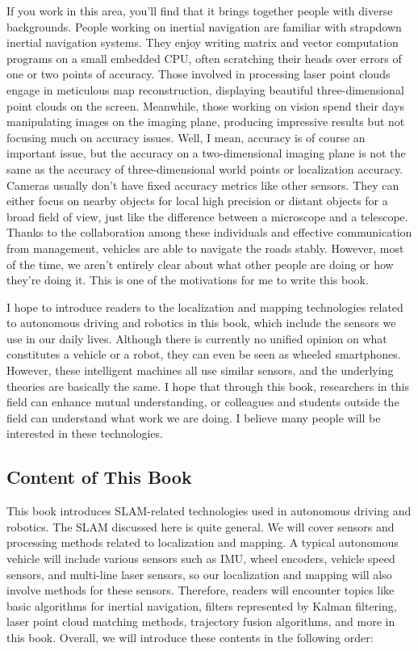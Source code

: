 If you work in this area, you'll find that it brings together people with diverse backgrounds. People working on inertial navigation are familiar with strapdown inertial navigation systems. They enjoy writing matrix and vector computation programs on a small embedded CPU, often scratching their heads over errors of one or two points of accuracy. Those involved in processing laser point clouds engage in meticulous map reconstruction, displaying beautiful three-dimensional point clouds on the screen. Meanwhile, those working on vision spend their days manipulating images on the imaging plane, producing impressive results but not focusing much on accuracy issues. Well, I mean, accuracy is of course an important issue, but the accuracy on a two-dimensional imaging plane is not the same as the accuracy of three-dimensional world points or localization accuracy. Cameras usually don't have fixed accuracy metrics like other sensors. They can either focus on nearby objects for local high precision or distant objects for a broad field of view, just like the difference between a microscope and a telescope. Thanks to the collaboration among these individuals and effective communication from management, vehicles are able to navigate the roads stably. However, most of the time, we aren't entirely clear about what other people are doing or how they're doing it. This is one of the motivations for me to write this book.


I hope to introduce readers to the localization and mapping technologies related to autonomous driving and robotics in this book, which include the sensors we use in our daily lives. Although there is currently no unified opinion on what constitutes a vehicle or a robot, they can even be seen as wheeled smartphones. However, these intelligent machines all use similar sensors, and the underlying theories are basically the same. I hope that through this book, researchers in this field can enhance mutual understanding, or colleagues and students outside the field can understand what work we are doing. I believe many people will be interested in these technologies.

\subsection*{Content of This Book}
This book introduces SLAM-related technologies used in autonomous driving and robotics. The SLAM discussed here is quite general. We will cover sensors and processing methods related to localization and mapping. A typical autonomous vehicle will include various sensors such as IMU, wheel encoders, vehicle speed sensors, and multi-line laser sensors, so our localization and mapping will also involve methods for these sensors. Therefore, readers will encounter topics like basic algorithms for inertial navigation, filters represented by Kalman filtering, laser point cloud matching methods, trajectory fusion algorithms, and more in this book. Overall, we will introduce these contents in the following order:

